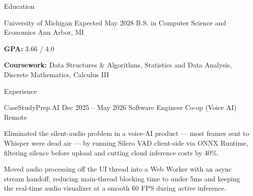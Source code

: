 \documentclass[
	11pt
]{../../../template}
\begin{document}
	\begin{rSection}{E}{ducation}
		\begin{rSectionEntry}
			{University of Michigan}
			{Expected May 2028}
			{B.S. in Computer Science and Economics}
			{}
			{Ann Arbor, MI}

			\item \textbf{GPA:} 3.66 / 4.0
			\item \textbf{Coursework:} Data Structures \& Algorithms, Statistics and Data Analysis, Discrete Mathematics, Calculus III
		\end{rSectionEntry}
	\end{rSection}

	\begin{rSection}{E}{xperience}
		\begin{rSectionEntry}
			{CaseStudyPrep.AI}
			{Dec 2025 -- May 2026}
			{Software Engineer Co-op (Voice AI)}
			{}
			{Remote}

			\item Eliminated the silent-audio problem in a voice-AI product — most frames sent to Whisper were dead air — by running Silero VAD client-side via ONNX Runtime, filtering silence before upload and cutting cloud inference costs by 40\%.
			\item Moved audio processing off the UI thread into a Web Worker with an async stream handoff, reducing main-thread blocking time to under 5ms and keeping the real-time audio visualizer at a smooth 60 FPS during active inference.
		\end{rSectionEntry}
	\end{rSection}
\end{document}
